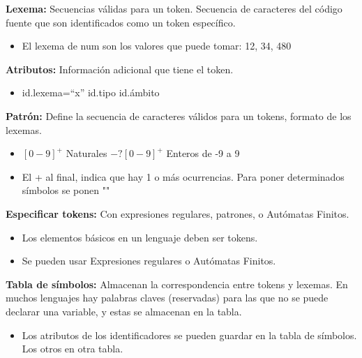 \documentclass[12pt, twoside, openright]{report} %
\begin{document}
\textbf{Lexema:} Secuencias válidas para un token. Secuencia de
caracteres del código fuente que son identificados como un token
específico.

\begin{itemize}

\item
  El lexema de num son los valores que puede tomar: 12, 34, 480
\end{itemize}

\textbf{Atributos:} Información adicional que tiene el token.

\begin{itemize}

\item
  id.lexema=``x'' id.tipo id.ámbito
\end{itemize}

\textbf{Patrón:} Define la secuencia de caracteres válidos para un
tokens, formato de los lexemas.

\begin{itemize}
\item
  \([0-9]^+\) Naturales \(-?[0-9]^+\) Enteros de -9 a 9
\item
  El + al final, indica que hay 1 o más ocurrencias. Para poner
  determinados símbolos se ponen ""
\end{itemize}

\textbf{Especificar tokens:} Con expresiones regulares, patrones, o
Autómatas Finitos.

\begin{itemize}
\item
  Los elementos básicos en un lenguaje deben ser tokens.
\item
  Se pueden usar Expresiones regulares o Autómatas Finitos.
\end{itemize}

\textbf{Tabla de símbolos:} Almacenan la correspondencia entre tokens y lexemas. 
En muchos lenguajes hay palabras claves (reservadas) para las que no se puede declarar una variable, y estas se almacenan en la tabla.

\begin{itemize}

\item
  Los atributos de los identificadores se pueden guardar en la tabla de
  símbolos. Los otros en otra tabla.
\end{itemize}

\begin{figure}[H]
  {\def\svgwidth{.9\textwidth}
  }
\end{figure}
\end{document}
